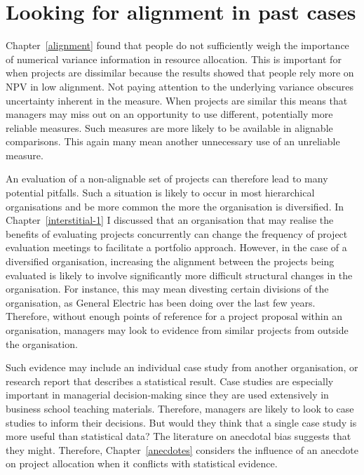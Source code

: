 \documentclass[a4paper, nobind, dvipsnames]{templates/ociamthesis}
\theoremstyle{definition}
\theoremstyle{definition}
\theoremstyle{definition}
\theoremstyle{definition}
\theoremstyle{remark}
\begin{document}
\newpage

\printbibliography[segment=\therefsegment,heading=subbibintoc]

\hypertarget{interstitial-2}{%
\chapter{Looking for alignment in past cases}\label{interstitial-2}}

Chapter~\ref{alignment} found that people do not sufficiently weigh the
importance of numerical variance information in resource allocation. This is
important for when projects are dissimilar because the results showed that
people rely more on NPV in low alignment. Not paying attention to the underlying
variance obscures uncertainty inherent in the measure. When projects are similar
this means that managers may miss out on an opportunity to use different,
potentially more reliable measures. Such measures are more likely to be
available in alignable comparisons. This again many mean another unnecessary use
of an unreliable measure.

An evaluation of a non-alignable set of projects can therefore lead to many
potential pitfalls. Such a situation is likely to occur in most hierarchical
organisations and be more common the more the organisation is diversified. In
Chapter~\ref{interstitial-1} I discussed that an organisation that may realise
the benefits of evaluating projects concurrently can change the frequency of
project evaluation meetings to facilitate a portfolio approach. However, in the
case of a diversified organisation, increasing the alignment between the
projects being evaluated is likely to involve significantly more difficult
structural changes in the organisation. For instance, this may mean divesting
certain divisions of the organisation, as General Electric has been doing over
the last few years. Therefore, without enough points of reference for a project
proposal within an organisation, managers may look to evidence from similar
projects from outside the organisation.

Such evidence may include an individual case study from another organisation, or
research report that describes a statistical result. Case studies are especially
important in managerial decision-making since they are used extensively in
business school teaching materials. Therefore, managers are likely to look to
case studies to inform their decisions. But would they think that a single case
study is more useful than statistical data? The literature on anecdotal bias
suggests that they might. Therefore, Chapter~\ref{anecdotes} considers the
influence of an anecdote on project allocation when it conflicts with
statistical evidence.
\end{document}
